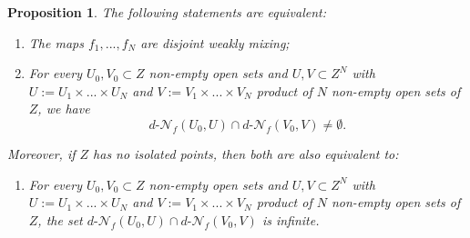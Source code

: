 \documentclass[11pt,reqno]{article}
\newtheorem{proposition}[statement]{Proposition}
\def\dret{d\text{-}\ret}
\def\ret{\mathcal{N}}
\def\NN{\Bbb N}
\begin{document}
\begin{proposition}
\label{prop:d-wm_intersec}
The following statements are equivalent:
\begin{enumerate}
    \item[\rm (i)] The maps $f_1,...,f_N$ are disjoint weakly mixing;
    \item[\rm (ii)] For every $U_0,V_0\subset Z$ non-empty open sets and $U, V\subset Z^N$ with $U:=U_1\times...\times U_N$ and $V:=V_1\times...\times V_N$ product of $N$ non-empty open sets of $Z$, we have
\begin{equation*}
    \dret_f(U_0,U) \cap \dret_f(V_0,V) \neq \emptyset.
\end{equation*}
\end{enumerate}

Moreover, if $Z$ has no isolated points, then both are also equivalent to:
\begin{enumerate}
\item[\rm (iii)] For every $U_0,V_0\subset Z$ non-empty open sets and $U, V\subset Z^N$ with $U:=U_1\times...\times U_N$ and $V:=V_1\times...\times V_N$ product of $N$ non-empty open sets of $Z$, the set $\dret_f(U_0,U) \cap \dret_f(V_0,V)$ is infinite.
\end{enumerate}
\end{proposition}






\end{document}
